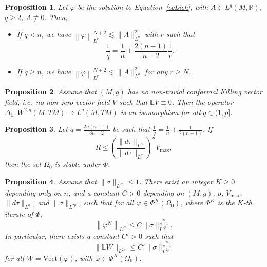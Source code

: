 \documentclass[10pt,a4paper]{amsart}
\newtheorem{proposition}{Proposition}
\newcommand{\bL}{\mathbb{L}}
\newcommand{\bR}{\mathbb{R}}
\renewcommand{\phi}{\varphi}
\begin{document}
\begin{proposition}\label{propEstimateLichUpper}
    Let $\phi$ be the solution to Equation~\eqref{eqLich}, with $A \in L^q(M,
        \bR)$, $q \geq 2$, $A \not\equiv 0$. Then,

    \begin{itemize}
        \item If $q < n$, we have $\left\|\phi\right\|_{L^r}^{N+2} \lesssim \|A\|_{L^q}^2$
              with $r$ such that
              \[
                  \frac{1}{q} = \frac{1}{n} + \frac{2(n-1)}{n-2} \frac{1}{r}.
              \]
        \item If $q \geq n$, we have $\left\|\phi\right\|_{L^r}^{N+2} \lesssim \|A\|_{L^q}^2$
              for any $r \geq N$.
    \end{itemize}
\end{proposition}

\begin{proposition}\label{propVector}
    Assume that $(M, g)$ has no non-trivial conformal Killing vector field, i.e.\
    no non-zero vector field $V$ such that $\bL V \equiv 0$. Then the operator
    $\Delta_{\bL}: W^{2, q}(M, TM) \to L^q(M, TM)$ is an isomorphism for all $q \in
        (1, p]$.
\end{proposition}

\begin{proposition}\label{propStability}
	Let $q = \frac{2n(n-1)}{3n-2}$ be such that $\frac{1}{q} = \frac{1}{n} +
		\frac{1}{2(n-1)}$. If
	\[
		R \leq \left(\frac{\|d\tau\|_{L^n}}{\|d\tau\|_{L^q}}\right)^n V_{\max},
	\]
	then the set $\Omega_0$ is stable under $\Phi$.
\end{proposition}

\begin{proposition}\label{propBootstrap}
	Assume that $\|\sigma\|_{L^{2p}} \leq 1$. There exist an integer $K \geq 0$
	depending only on $n$, and a constant $C > 0$ depending on $(M, g)$, $p$,
	$V_{\max}$, $\|d\tau\|_{L^n}$, and $\|\sigma\|_{L^{2p}}$, such that for all
	$\phi \in \Phi^K\left(\Omega_0\right)$, where $\Phi^K$ is the $K$-th iterate of $\Phi$,
	\[
		\left\|\phi^N\right\|_{L^{2p}} \leq C \|\sigma\|_{L^{2p}}^{\frac{n}{n-1}}.
	\]
	In particular, there exists a constant $C' > 0$ such that
	\[
		\|\bL W\|_{L^{2p}} \leq C' \|\sigma\|_{L^{2p}}^{\frac{n}{n-1}}
	\]
	for all $W = \mathrm{Vect}(\phi)$, with $\phi \in \Phi^K(\Omega_0)$.
\end{proposition}
\end{document}
